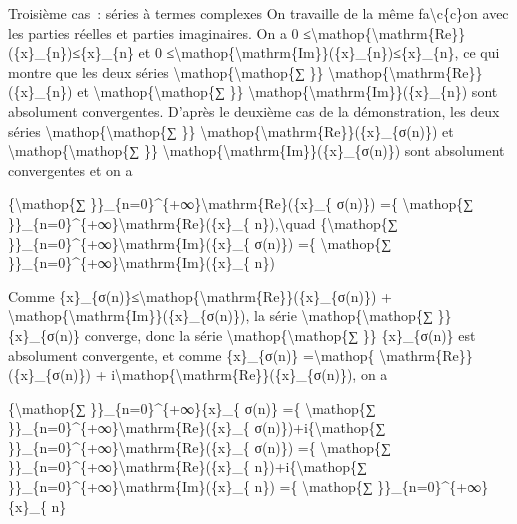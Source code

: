 \documentclass[]{article}
\begin{document}
Troisième cas~: séries à termes complexes On travaille de la même
fa\textbackslash{}c\{c\}on avec les parties réelles et parties
imaginaires. On a 0
≤\textbar{}\textbackslash{}mathop\{\textbackslash{}mathrm\{Re\}\}(\{x\}\_\{n\})\textbar{}≤\textbar{}\{x\}\_\{n\}\textbar{}
et 0
≤\textbar{}\textbackslash{}mathop\{\textbackslash{}mathrm\{Im\}\}(\{x\}\_\{n\})\textbar{}≤\textbar{}\{x\}\_\{n\}\textbar{},
ce qui montre que les deux séries
\textbackslash{}mathop\{\textbackslash{}mathop\{∑ \}\}
\textbackslash{}mathop\{\textbackslash{}mathrm\{Re\}\}(\{x\}\_\{n\}) et
\textbackslash{}mathop\{\textbackslash{}mathop\{∑ \}\}
\textbackslash{}mathop\{\textbackslash{}mathrm\{Im\}\}(\{x\}\_\{n\})
sont absolument convergentes. D'après le deuxième cas de la
démonstration, les deux séries
\textbackslash{}mathop\{\textbackslash{}mathop\{∑ \}\}
\textbackslash{}mathop\{\textbackslash{}mathrm\{Re\}\}(\{x\}\_\{σ(n)\})
et \textbackslash{}mathop\{\textbackslash{}mathop\{∑ \}\}
\textbackslash{}mathop\{\textbackslash{}mathrm\{Im\}\}(\{x\}\_\{σ(n)\})
sont absolument convergentes et on a

\{\textbackslash{}mathop\{∑
\}\}\_\{n=0\}\^{}\{+∞\}\textbackslash{}mathrm\{Re\}(\{x\}\_\{ σ(n)\})
=\{ \textbackslash{}mathop\{∑
\}\}\_\{n=0\}\^{}\{+∞\}\textbackslash{}mathrm\{Re\}(\{x\}\_\{
n\}),\textbackslash{}quad \{\textbackslash{}mathop\{∑
\}\}\_\{n=0\}\^{}\{+∞\}\textbackslash{}mathrm\{Im\}(\{x\}\_\{ σ(n)\})
=\{ \textbackslash{}mathop\{∑
\}\}\_\{n=0\}\^{}\{+∞\}\textbackslash{}mathrm\{Im\}(\{x\}\_\{ n\})

Comme
\textbar{}\{x\}\_\{σ(n)\}\textbar{}≤\textbar{}\textbackslash{}mathop\{\textbackslash{}mathrm\{Re\}\}(\{x\}\_\{σ(n)\})\textbar{}
+
\textbar{}\textbackslash{}mathop\{\textbackslash{}mathrm\{Im\}\}(\{x\}\_\{σ(n)\})\textbar{},
la série \textbackslash{}mathop\{\textbackslash{}mathop\{∑ \}\}
\textbar{}\{x\}\_\{σ(n)\}\textbar{} converge, donc la série
\textbackslash{}mathop\{\textbackslash{}mathop\{∑ \}\} \{x\}\_\{σ(n)\}
est absolument convergente, et comme \{x\}\_\{σ(n)\}
=\textbackslash{}mathop\{
\textbackslash{}mathrm\{Re\}\}(\{x\}\_\{σ(n)\}) +
i\textbackslash{}mathop\{\textbackslash{}mathrm\{Re\}\}(\{x\}\_\{σ(n)\}),
on a

\{\textbackslash{}mathop\{∑ \}\}\_\{n=0\}\^{}\{+∞\}\{x\}\_\{ σ(n)\} =\{
\textbackslash{}mathop\{∑
\}\}\_\{n=0\}\^{}\{+∞\}\textbackslash{}mathrm\{Re\}(\{x\}\_\{
σ(n)\})+i\{\textbackslash{}mathop\{∑
\}\}\_\{n=0\}\^{}\{+∞\}\textbackslash{}mathrm\{Re\}(\{x\}\_\{ σ(n)\})
=\{ \textbackslash{}mathop\{∑
\}\}\_\{n=0\}\^{}\{+∞\}\textbackslash{}mathrm\{Re\}(\{x\}\_\{
n\})+i\{\textbackslash{}mathop\{∑
\}\}\_\{n=0\}\^{}\{+∞\}\textbackslash{}mathrm\{Im\}(\{x\}\_\{ n\}) =\{
\textbackslash{}mathop\{∑ \}\}\_\{n=0\}\^{}\{+∞\}\{x\}\_\{ n\}
\end{document}
